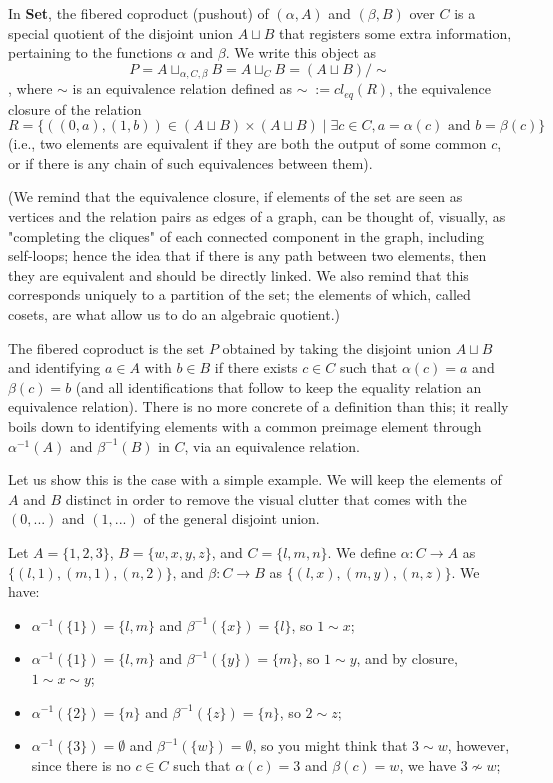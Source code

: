 \documentclass[12pt, letterpaper, twoside]{report}
\begin{document}
In \textbf{Set}, the fibered coproduct (pushout) of $(\alpha, A)$ and $(\beta, B)$ over $C$ is a special quotient of the disjoint union $A \sqcup B$ that registers some extra information, pertaining to the functions $\alpha$ and $\beta$. We write this object as $$P = A \sqcup_{\alpha, C, \beta} B = A \sqcup_C B = (A \sqcup B) / \sim$$, where $\sim$ is an equivalence relation defined as  $\sim \; := cl_{eq}(R)$, the equivalence closure of the relation $$R = \{((0, a), (1, b)) \in (A \sqcup B) \times (A \sqcup B) \mid \exists c \in C, a = \alpha(c) \text{ and } b = \beta(c) \}$$ (i.e., two elements are equivalent if they are both the output of some common $c$, or if there is any chain of such equivalences between them).

(We remind that the equivalence closure, if elements of the set are seen as vertices and the relation pairs as edges of a graph, can be thought of, visually, as "completing the cliques" of each connected component in the graph, including self-loops; hence the idea that if there is any path between two elements, then they are equivalent and should be directly linked. We also remind that this corresponds uniquely to a partition of the set; the elements of which, called cosets, are what allow us to do an algebraic quotient.)

The fibered coproduct is the set $P$ obtained by taking the disjoint union $A \sqcup B$ and identifying $a \in A$ with $b \in B$ if there exists $c \in C$ such that $\alpha(c) = a$ and $\beta(c) = b$ (and all identifications that follow to keep the equality relation an equivalence relation). There is no more concrete of a definition than this; it really boils down to identifying elements with a common preimage element through $\alpha^{-1}(A)$ and $\beta^{-1}(B)$ in $C$, via an equivalence relation.

Let us show this is the case with a simple example. We will keep the elements of $A$ and $B$ distinct in order to remove the visual clutter that comes with the $(0, ...)$ and $(1, ...)$ of the general disjoint union.

Let $A = \{ 1, 2, 3 \}$, $B = \{ w, x, y, z \}$, and $C = \{ l, m, n \}$. We define $\alpha : C \to A$ as $\{ (l, 1), (m, 1), (n, 2) \}$, and $\beta : C \to B$ as $\{ (l, x), (m, y), (n, z) \}$. We have:

\begin{itemize}
	\item $\alpha^{-1}(\{1\}) = \{l,m\}$ and $\beta^{-1}(\{x\}) = \{l\}$, so $1 \sim x$;
	\item $\alpha^{-1}(\{1\}) = \{l,m\}$ and $\beta^{-1}(\{y\}) = \{m\}$, so $1 \sim y$, and by closure, $1 \sim x \sim y$;
	\item $\alpha^{-1}(\{2\}) = \{n\}$ and $\beta^{-1}(\{z\}) = \{n\}$, so $2 \sim z$;
	\item $\alpha^{-1}(\{3\}) = \emptyset$ and $\beta^{-1}(\{w\}) = \emptyset$, so you might think that $3 \sim w$, however, since there is no $c \in C$ such that $\alpha(c) = 3$ and $\beta(c) = w$, we have $3 \nsim w$;
\end{itemize}
\end{document}
